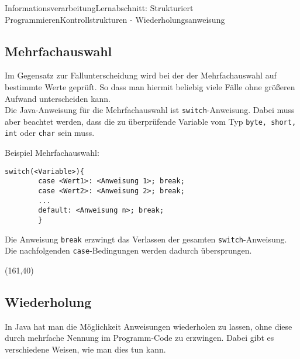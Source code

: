 \documentclass[11pt,oneside,openany,headings=optiontotoc,11pt,numbers=noenddot]{article}
\begin{document}
\begin{worksheet}{Informationsverarbeitung}{Lernabschnitt: Strukturiert Programmieren}{Kontrollstrukturen - Wiederholungsanweisung}
		\subsection{Mehrfachauswahl}
		Im Gegensatz zur Fallunterscheidung wird bei der der Mehrfachauswahl auf bestimmte Werte geprüft. So dass man hiermit beliebig viele Fälle ohne größeren Aufwand unterscheiden kann.\\
		Die Java-Anweisung für die Mehrfachauswahl ist \lstinline[style=JavaInputStyle]|switch|-Anweisung. Dabei muss aber beachtet werden, dass die zu überprüfende Variable vom Typ \lstinline[style=JavaInputStyle]|byte, short, int| oder \lstinline[style=JavaInputStyle]|char| sein muss.\\
		\par\noindent
		Beispiel Mehrfachauswahl:
		\begin{lstlisting}[style=JavaInputStyle,frame=single]
		switch(<Variable>){
		case <Wert1>: <Anweisung 1>; break;
		case <Wert2>: <Anweisung 2>; break;
		...
		default: <Anweisung n>; break;
		}
		\end{lstlisting}
		Die Anweisung \lstinline[style=JavaInputStyle]|break| erzwingt das Verlassen der gesamten \lstinline[style=JavaInputStyle]|switch|-Anweisung. Die nachfolgenden \lstinline[style=JavaInputStyle]|case|-Bedingungen werden dadurch übersprungen.\\
		\begin{struktogramm}(161,40)
			\caseend
			
		\end{struktogramm}
		\subsection{Wiederholung}
		In Java hat man die Möglichkeit Anweisungen wiederholen zu lassen, ohne diese durch mehrfache Nennung im Programm-Code zu erzwingen. Dabei gibt es verschiedene Weisen, wie man dies tun kann.

\end{worksheet}
\end{document}

